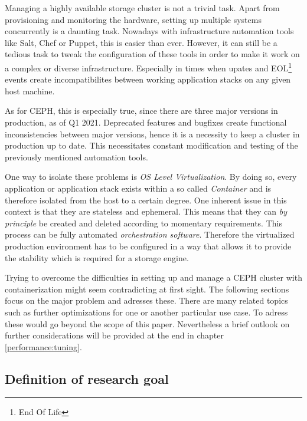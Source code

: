 \documentclass[titlepage, a4paper, 11pt]{scrartcl}
\begin{document}
            Managing a highly available storage cluster is not a trivial task. Apart from provisioning and monitoring the hardware,
            setting up multiple systems concurrently is a daunting task. Nowadays with infrastructure automation tools like Salt, Chef or Puppet, 
            this is easier than ever. However, it can still be a tedious task to tweak the configuration of these tools
            in order to make it work on a complex or diverse infrastructure. Especially in times when upates and EOL\footnote{End Of Life} events
            create incompatibilites between working application stacks on any given host machine.

            As for CEPH, this is especially true, since there are three major versions in production\cite{cephreleases}, as of Q1 2021.
            Deprecated features and bugfixes create functional inconsistencies between major versions, hence it is a necessity to 
            keep a cluster in production up to date. This necessitates constant modification and testing of the previously mentioned automation tools.

            One way to isolate these problems is \textit{OS Level Virtualization}. By doing so, every application or application stack 
            exists within a so called \textit{Container} and is therefore isolated from the host to a certain degree. 
            One inherent issue in this context is that they are stateless and ephemeral. This means that they can 
            \textit{by principle} be created and deleted according to momentary requirements. This process can be fully automated 
            \textit{orchestration software}. Therefore the virtualized production environment has to be
            configured in a way that allows it to provide the stability which is required for a storage engine.

            Trying to overcome the difficulties in setting up and manage a CEPH cluster with containerization might seem contradicting
            at first sight. The following sections focus on the major problem and adresses these. There are many related topics such as
            further optimizations for one or another particular use case. To adress these would go beyond the scope of this paper.
            Nevertheless a brief outlook on further considerations will be provided at the end in chapter \ref*{performance:tuning}.

        \subsection{Definition of research goal}\label{research-goal}
        
\end{document}
